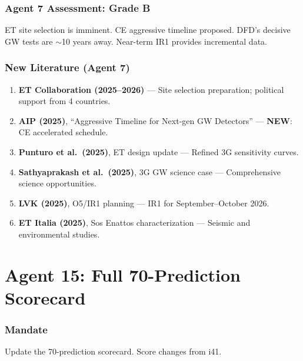 \documentclass[11pt,a4paper]{article}
\newcommand{\NEW}{\textcolor{dfdblue}{\textbf{NEW}}}
\begin{document}
\section{Agent 7 Assessment: Grade B}

ET site selection is imminent. CE aggressive timeline proposed. DFD's decisive GW tests are $\sim$10 years away. Near-term IR1 provides incremental data.

\section{New Literature (Agent 7)}

\begin{enumerate}
\item \textbf{ET Collaboration (2025--2026)} --- Site selection preparation; political support from 4 countries.

\item \textbf{AIP (2025)}, ``Aggressive Timeline for Next-gen GW Detectors'' --- \NEW: CE accelerated schedule.

\item \textbf{Punturo et al.\ (2025)}, ET design update --- Refined 3G sensitivity curves.

\item \textbf{Sathyaprakash et al.\ (2025)}, 3G GW science case --- Comprehensive science opportunities.

\item \textbf{LVK (2025)}, O5/IR1 planning --- IR1 for September--October 2026.

\item \textbf{ET Italia (2025)}, Sos Enattos characterization --- Seismic and environmental studies.
\end{enumerate}


\part{Agent 15: Full 70-Prediction Scorecard}
\label{part:agent15}

\section{Mandate}

Update the 70-prediction scorecard. Score changes from i41.
\end{document}
